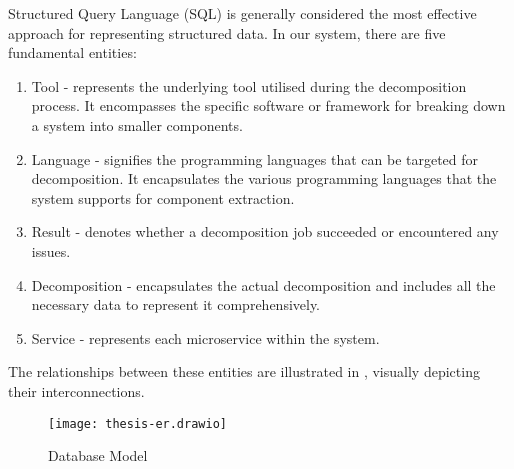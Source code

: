 Structured Query Language (SQL) is generally considered the most effective
approach for representing structured data. In our system, there are five
fundamental entities:

\begin{enumerate}
  \item Tool - represents the underlying tool utilised during the decomposition
    process. It encompasses the specific software or framework for breaking
    down a system into smaller components.
  \item Language - signifies the programming languages that can be targeted for
    decomposition. It encapsulates the various programming languages that the
    system supports for component extraction.
  \item Result - denotes whether a decomposition job succeeded or encountered
    any issues.
  \item Decomposition - encapsulates the actual decomposition and includes all
    the necessary data to represent it comprehensively.
  \item Service - represents each microservice within the system.
\end{enumerate}

The relationships between these entities are illustrated in
, visually depicting their interconnections.

\begin{figure*}[!htb]
  \caption{Database Model}
  \label{fig:database-model}
  \centering
  \texttt{[image: thesis-er.drawio]}
\end{figure*}

